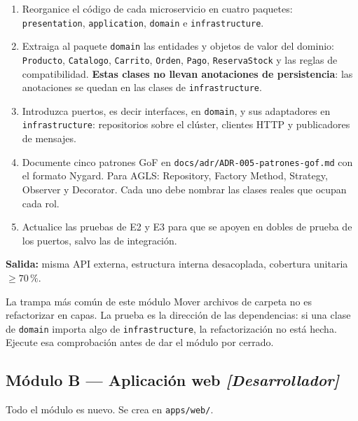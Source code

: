 \documentclass[11pt,a4paper]{article}
\begin{document}
\begin{enumerate}[leftmargin=*,itemsep=3pt]
	\item Reorganice el código de cada microservicio en cuatro paquetes: \texttt{presentation}, \texttt{application}, \texttt{domain} e \texttt{infrastructure}.
	\item Extraiga al paquete \texttt{domain} las entidades y objetos de valor del dominio: \texttt{Producto}, \texttt{Catalogo}, \texttt{Carrito}, \texttt{Orden}, \texttt{Pago}, \texttt{ReservaStock} y las reglas de compatibilidad. \textbf{Estas clases no llevan anotaciones de persistencia}: las anotaciones se quedan en las clases de \texttt{infrastructure}.
	\item Introduzca puertos, es decir interfaces, en \texttt{domain}, y sus adaptadores en \texttt{infrastructure}: repositorios sobre el clúster, clientes HTTP y publicadores de mensajes.
	\item Documente cinco patrones GoF en \texttt{docs/adr/ADR-005-\allowbreak patrones-gof.md} con el formato Nygard. Para AGLS: Repository, Factory Method, Strategy, Observer y Decorator. Cada uno debe nombrar las clases reales que ocupan cada rol.
	\item Actualice las pruebas de E2 y E3 para que se apoyen en dobles de prueba de los puertos, salvo las de integración.
\end{enumerate}

\textbf{Salida:} misma API externa, estructura interna desacoplada, cobertura unitaria $\geq 70\,\%$.

\begin{avisoBox}{La trampa más común de este módulo}
	Mover archivos de carpeta no es refactorizar en capas. La prueba es la dirección de las dependencias: si una clase de \texttt{domain} importa algo de \texttt{infrastructure}, la refactorización no está hecha. Ejecute esa comprobación antes de dar el módulo por cerrado.
\end{avisoBox}

\subsection{Módulo B --- Aplicación web \emph{[Desarrollador]}}

Todo el módulo es nuevo. Se crea en \texttt{apps/web/}.
\end{document}
